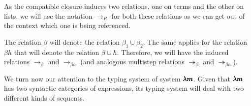 \begin{remark}
  As the compatible closure induces two relations, one on terms and the other on lists, we will use the notation $\to_R$ for both these relations as we can get out of the context which one is being referenced.
\end{remark}

\begin{definition}
  The relation $\beta$ will denote the relation $\beta_1 \cup \beta_2$.
  The same applies for the relation $\beta h$ that will denote the relation $\beta \cup h$.
  Therefore, we will have the induced relations $\to_\beta$ and $\to_{\beta h}$ (and analogous multistep relations $\twoheadrightarrow_\beta$ and $\twoheadrightarrow_{\beta h}$).
\end{definition}


\begin{comment}
\begin{definition}[$\beta h$-normal forms]
  We inductively define the sets of $\LamM$-terms and $\LamM$-lists in $\beta h$-normal form, respectively NF and NL, as follows:
  \[
    \begin{prooftree}
      \infer0{ x \in \text{NF} }
    \end{prooftree}
    \qquad
    \begin{prooftree}
      \hypo{ t \in \text{NF} }
      \infer1{ \lambda x . t \in \text{NF} } 
    \end{prooftree}
    \qquad
    \begin{prooftree}
      \hypo{ u \in \text{NF} } 
      \hypo{ l \in \text{NL} }
      \infer2{ x(u, l) \in \text{NF} }
    \end{prooftree}
    \qquad
    \begin{prooftree}
      \infer0{ [] \in \text{NL} } 
    \end{prooftree}
    \qquad
    \begin{prooftree}
      \hypo{ u \in \text{NF} }
      \hypo{ l \in \text{NL} }
      \infer2{ u::l \in \text{NL} }
    \end{prooftree}
  \]
\end{definition}
\end{comment}


We turn now our attention to the typing system of system $\pmb{\lambda m}$.
Given that $\pmb{\lambda m}$ has two syntactic categories of expressions, its typing system will deal with two different kinds of sequents.


